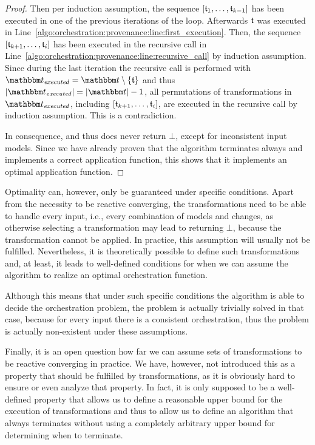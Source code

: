 \begin{proof}
    Then per induction assumption, the sequence $\sequenced{\transformation{t}_{1}, \dots, \transformation{t}_{k-1}}$ has been executed in one of the previous iterations of the loop.
    Afterwards $\transformation{t}$ was executed in Line~\ref{algo:orchestration:provenance:line:first_execution}.
    Then, the sequence $\sequenced{\transformation{t}_{k+1}, \dots, \transformation{t}_{i}}$ has been executed in the recursive call in Line~\ref{algo:orchestration:provenance:line:recursive_call} by induction assumption.
    Since during the last iteration the recursive call is performed with $\provalgexecuted = \transformationset{t} \setminus \setted{\transformation{t}}$ and thus $\abs{\provalgexecuted} = \abs{\transformationset{t}} - 1$, all permutations of transformations in $\provalgexecuted$, including $\sequenced{\transformation{t}_{k+1}, \dots, \transformation{t}_{i}}$, are executed in the recursive call by induction assumption.
    This is a contradiction.

    In consequence,  and thus  does never return $\bot$, except for inconsistent input models. Since we have already proven that the algorithm terminates always and implements a correct application function, this shows that it implements an optimal application function.
\end{proof}

Optimality can, however, only be guaranteed under specific conditions.
Apart from the necessity to be reactive converging, the transformations need to be able to handle every input, i.e., every combination of models and changes, as otherwise selecting a transformation may lead to  returning $\bot$, because the transformation cannot be applied.
In practice, this assumption will usually not be fulfilled.
Nevertheless, it is theoretically possible to define such transformations and, at least, it leads to well-defined conditions for when we can assume the algorithm to realize an optimal orchestration function.

Although this means that under such specific conditions the algorithm is able to decide the orchestration problem, the problem is actually trivially solved in that case, because for every input there is a consistent orchestration, thus the problem is actually non-existent under these assumptions.

Finally, it is an open question how far we can assume sets of transformations to be reactive converging in practice.
We have, however, not introduced this as a property that should be fulfilled by transformations, as it is obviously hard to ensure or even analyze that property.
In fact, it is only supposed to be a well-defined property that allows us to define a reasonable upper bound for the execution of transformations and thus to allow us to define an algorithm that always terminates without using a completely arbitrary upper bound for determining when to terminate.


